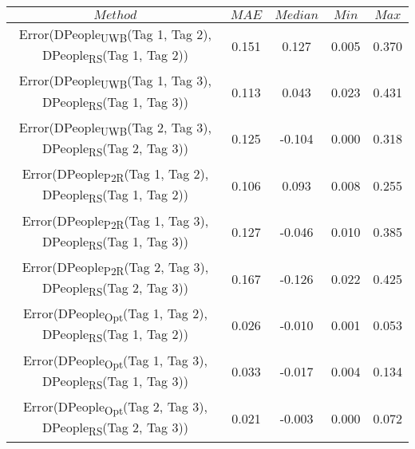 \begin{table}[h]
\centering
{\small
\begin{tabular}{|c|c|c|c|c|}
\hline
$Method$ & $MAE$ & $Median$ & $Min$ & $Max$ \\
\hline
{\scriptsize Error(DPeople\textsubscript{UWB}(Tag 1, Tag 2), DPeople\textsubscript{RS}(Tag 1, Tag 2))} & 0.151 & 0.127 & 0.005 & 0.370 \\
\hline
{\scriptsize Error(DPeople\textsubscript{UWB}(Tag 1, Tag 3), DPeople\textsubscript{RS}(Tag 1, Tag 3))} & 0.113 & 0.043 & 0.023 & 0.431 \\
\hline
{\scriptsize Error(DPeople\textsubscript{UWB}(Tag 2, Tag 3), DPeople\textsubscript{RS}(Tag 2, Tag 3))} & 0.125 & -0.104 & 0.000 & 0.318 \\
\hline
{\scriptsize Error(DPeople\textsubscript{P2R}(Tag 1, Tag 2), DPeople\textsubscript{RS}(Tag 1, Tag 2))} & 0.106 & 0.093 & 0.008 & 0.255 \\
\hline
{\scriptsize Error(DPeople\textsubscript{P2R}(Tag 1, Tag 3), DPeople\textsubscript{RS}(Tag 1, Tag 3))} & 0.127 & -0.046 & 0.010 & 0.385 \\
\hline
{\scriptsize Error(DPeople\textsubscript{P2R}(Tag 2, Tag 3), DPeople\textsubscript{RS}(Tag 2, Tag 3))} & 0.167 & -0.126 & 0.022 & 0.425 \\
\hline
{\scriptsize Error(DPeople\textsubscript{Opt}(Tag 1, Tag 2), DPeople\textsubscript{RS}(Tag 1, Tag 2))} & 0.026 & -0.010 & 0.001 & 0.053 \\
\hline
{\scriptsize Error(DPeople\textsubscript{Opt}(Tag 1, Tag 3), DPeople\textsubscript{RS}(Tag 1, Tag 3))} & 0.033 & -0.017 & 0.004 & 0.134 \\
\hline
{\scriptsize Error(DPeople\textsubscript{Opt}(Tag 2, Tag 3), DPeople\textsubscript{RS}(Tag 2, Tag 3))} & 0.021 & -0.003 & 0.000 & 0.072 \\
\hline
\end{tabular}
}
\end{table}
